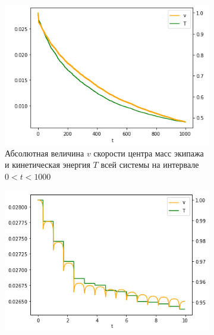 \begin{figure}[htb]
    \centering
        \begin{subfigure}[t]{\textwidth}
            \centering
            \includegraphics[width=\linewidth]{content/pic/new/impact/impact_2_Tv_long.png}
            \vspace{-25pt}
            \caption{Абсолютная величина $v$ скорости центра масс экипажа и кинетическая энергия $T$ всей системы на интервале $0 < t < 1000$}
            \label{fig:straight_Tv_long}
        \end{subfigure}
        \begin{subfigure}[t]{\textwidth}
            \vspace{15pt}
            \centering
            \includegraphics[width=\linewidth]{content/pic/new/impact/impact_2_Tv.png}
            \vspace{-25pt}

\end{subfigure}
\end{figure}
